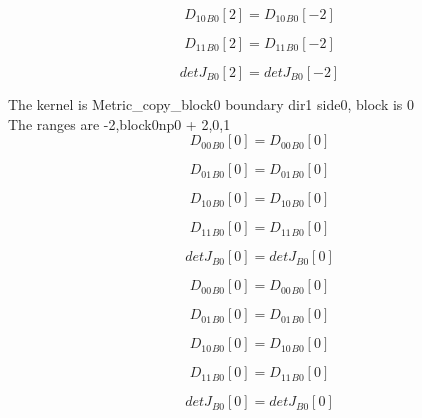 \documentclass{article}
\begin{document}
\begin{dmath}{D_{10}{_{B0}}}[{2}] = {D_{10}{_{B0}}}[{-2}]\end{dmath}

\begin{dmath}{D_{11}{_{B0}}}[{2}] = {D_{11}{_{B0}}}[{-2}]\end{dmath}

\begin{dmath}{detJ{_{B0}}}[{2}] = {detJ{_{B0}}}[{-2}]\end{dmath}

\noindent The kernel is Metric_copy_block0 boundary dir1 side0, block is 0\\\noindent The ranges are -2,block0np0 + 2,0,1\\\begin{dmath}{D_{00}{_{B0}}}[{0}] = {D_{00}{_{B0}}}[{0}]\end{dmath}

\begin{dmath}{D_{01}{_{B0}}}[{0}] = {D_{01}{_{B0}}}[{0}]\end{dmath}

\begin{dmath}{D_{10}{_{B0}}}[{0}] = {D_{10}{_{B0}}}[{0}]\end{dmath}

\begin{dmath}{D_{11}{_{B0}}}[{0}] = {D_{11}{_{B0}}}[{0}]\end{dmath}

\begin{dmath}{detJ{_{B0}}}[{0}] = {detJ{_{B0}}}[{0}]\end{dmath}

\begin{dmath}{D_{00}{_{B0}}}[{0}] = {D_{00}{_{B0}}}[{0}]\end{dmath}

\begin{dmath}{D_{01}{_{B0}}}[{0}] = {D_{01}{_{B0}}}[{0}]\end{dmath}

\begin{dmath}{D_{10}{_{B0}}}[{0}] = {D_{10}{_{B0}}}[{0}]\end{dmath}

\begin{dmath}{D_{11}{_{B0}}}[{0}] = {D_{11}{_{B0}}}[{0}]\end{dmath}

\begin{dmath}{detJ{_{B0}}}[{0}] = {detJ{_{B0}}}[{0}]\end{dmath}
\end{document}
